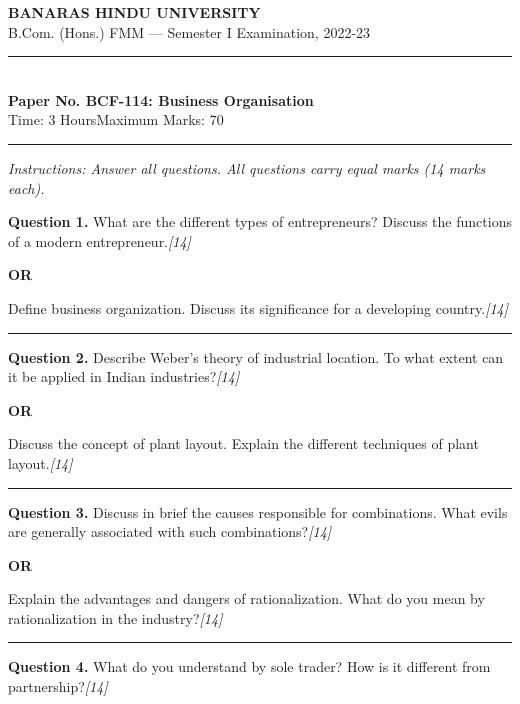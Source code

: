 \documentclass[11pt,a4paper]{article}
\newcommand{\pts}[1]{\hfill   \textit{[#1]}}
\begin{document}
\begin{center}
  {\large\bfseries BANARAS HINDU UNIVERSITY}\\[2pt]
  {\normalsize B.Com. (Hons.) FMM --- Semester I Examination, 2022-23}\\[6pt]
  \rule{0.8\linewidth}{0.5pt}\\[6pt]
  {\large\bfseries Paper No. BCF-114: Business Organisation}\\[4pt]
  {\normalsize Time: 3 Hours\hfill Maximum Marks: 70}
\end{center}

\rule{\linewidth}{0.4pt}

\smallskip



\noindent   \textit{Instructions: Answer all questions. All questions carry equal marks (14 marks each).}

\bigskip




\noindent   \textbf{Question 1.}
What are the different types of entrepreneurs? Discuss the functions of a modern entrepreneur.\pts{14}

\centerline{   \textbf{OR}}

Define business organization. Discuss its significance for a developing country.\pts{14}

\medskip\rule{\linewidth}{0.2pt}




\noindent   \textbf{Question 2.}
Describe Weber's theory of industrial location. To what extent can it be applied in Indian industries?\pts{14}

\centerline{   \textbf{OR}}

Discuss the concept of plant layout. Explain the different techniques of plant layout.\pts{14}

\medskip\rule{\linewidth}{0.2pt}




\noindent   \textbf{Question 3.}
Discuss in brief the causes responsible for combinations. What evils are generally associated with such combinations?\pts{14}

\centerline{   \textbf{OR}}

Explain the advantages and dangers of rationalization. What do you mean by rationalization in the industry?\pts{14}

\medskip\rule{\linewidth}{0.2pt}




\noindent   \textbf{Question 4.}
What do you understand by sole trader? How is it different from partnership?\pts{14}
\end{document}
